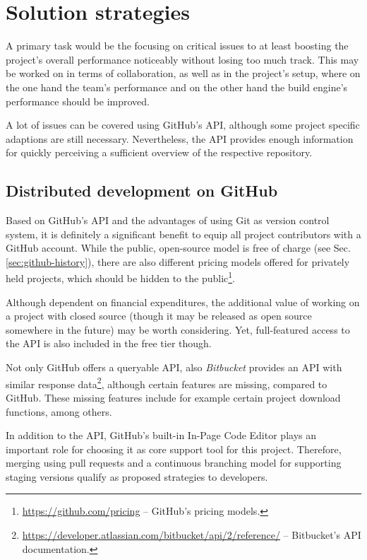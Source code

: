 \section{Solution strategies}
\label{sec:solution-strategies}

A primary task would be the focusing on critical issues to at least boosting the project's overall performance noticeably without losing too much track. This may be worked on in terms of collaboration, as well as in the project's setup, where on the one hand the team's performance and on the other hand the build engine's performance should be improved.

A lot of issues can be covered using GitHub's API, although some project specific adaptions are still necessary. Nevertheless, the API provides enough information for quickly perceiving a sufficient overview of the respective repository.


\subsection{Distributed development on GitHub}
\label{sec:solutions-distributeddevelopment}

Based on GitHub's API and the advantages of using Git as version control system, it is definitely a significant benefit to equip all project contributors with a GitHub account. While the public, open-source model is free of charge (see Sec. \ref{sec:github-history}), there are also different pricing models offered for privately held projects, which should be hidden to the public\footnote{\url{https://github.com/pricing} -- GitHub's pricing models.}.

Although dependent on financial expenditures, the additional value of working on a project with closed source (though it may be released as open source somewhere in the future) may be worth considering. Yet, full-featured access to the API is also included in the free tier though.

Not only GitHub offers a queryable API, also \emph{Bitbucket} provides an API with similar response data\footnote{\url{https://developer.atlassian.com/bitbucket/api/2/reference/} -- Bitbucket's API documentation.}, although certain features are missing, compared to GitHub. These missing features include for example certain project download functions, among others.

In addition to the API, GitHub's built-in In-Page Code Editor plays an important role for choosing it as core support tool for this project. Therefore, merging using pull requests and a continuous branching model for supporting staging versions qualify as proposed strategies to developers.


